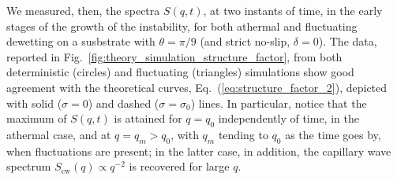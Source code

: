 We measured, then, the spectra $S(q,t)$, at two instants of time, 
in the early stages of the growth of the instability, for both athermal and fluctuating dewetting on a susbstrate with $\theta=\pi/9$ (and strict no-slip, $\delta=0$).
The data, reported in Fig.~\ref{fig:theory_simulation_structure_factor}, from both deterministic (circles)
and fluctuating (triangles) simulations show good agreement with the theoretical curves, Eq.~(\ref{eq:structure_factor_2}), depicted with solid ($\sigma=0$) and dashed ($\sigma=\sigma_0$) lines.
In particular, notice that the maximum  of $S(q,t)$ is attained for $q=q_0$ independently of time, in the athermal
case, and at $q = q_m > q_0$, with $q_m$ tending to $q_0$ as the time goes by, when 
fluctuations are present; in the latter case, in addition, the capillary wave spectrum $S_{\text{cw}}(q) \propto q^{-2}$
is recovered for large $q$.

